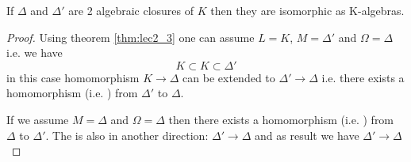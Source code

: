 \begin{corollary}
  If $\Delta$ and $\Delta'$ are 2 algebraic closures of $K$ then they
  are isomorphic as K-algebras.
  \begin{proof}
    Using theorem \ref{thm:lec2_3} one can assume
    $L = K$, $M = \Delta'$ and $\Omega = \Delta$ i.e. we have
    \[
    K \subset K \subset \Delta'
    \]
    in this case homomorphism $K \to \Delta$ can be extended to
    $\Delta' \to \Delta$ i.e. there exists a homomorphism
    (i.e. ) from $\Delta'$ to $\Delta$.

    If we assume $M = \Delta$ and $\Omega = \Delta$ then there exists
    a homomorphism (i.e. ) from $\Delta$ to
    $\Delta'$. The  is also
     in another direction: $\Delta' \to
    \Delta$ and as result we have  $\Delta' \to
    \Delta$ 
  \end{proof}
  \label{col:algebraic_closure_isomorphism}
\end{corollary}
